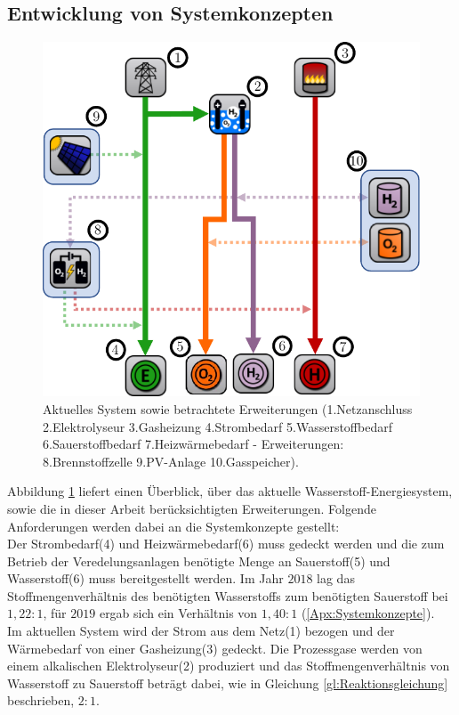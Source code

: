 \subsection{Entwicklung von Systemkonzepten}
\begin{figure}[h]
	\centering
		\includegraphics[scale=1]{Figures/Systemkonzepte}
		\caption{Aktuelles System sowie betrachtete Erweiterungen (1.Netzanschluss 2.Elektrolyseur 3.Gasheizung 4.Strombedarf 5.Wasserstoffbedarf 6.Sauerstoffbedarf 7.Heizwärmebedarf - Erweiterungen: 8.Brennstoffzelle 9.PV-Anlage 10.Gasspeicher).}
\label{fig:Modellstruktur}	
\end{figure}

Abbildung \ref{fig:Modellstruktur} liefert einen Überblick, über das aktuelle Wasserstoff-Energiesystem, sowie die in dieser Arbeit berücksichtigten Erweiterungen. Folgende Anforderungen werden dabei an die Systemkonzepte gestellt:\\
Der Strombedarf(4) und Heizwärmebedarf(6) muss gedeckt werden und die zum Betrieb der Veredelungsanlagen benötigte Menge an Sauerstoff(5) und Wasserstoff(6) muss bereitgestellt werden. Im Jahr $2018$ lag das Stoffmengenverhältnis des benötigten Wasserstoffs zum benötigten Sauerstoff bei $1,22:1$, für $2019$ ergab sich ein Verhältnis von $1,40:1$ (\ref{Apx:Systemkonzepte}).\\ 
Im aktuellen System wird der Strom aus dem Netz(1) bezogen und der Wärmebedarf von einer Gasheizung(3) gedeckt. Die Prozessgase werden von einem alkalischen Elektrolyseur(2) produziert und das Stoffmengenverhältnis von Wasserstoff zu Sauerstoff beträgt dabei, wie in Gleichung \ref{gl:Reaktionsgleichung} beschrieben, $2:1$.\\


